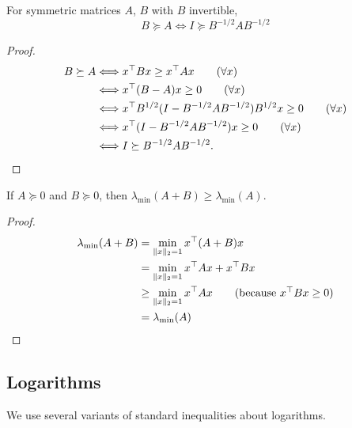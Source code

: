 \begin{lemma} \label{lem:conj_succ}
  For symmetric matrices $A$, $B$ with $B$ invertible,
  \[
    B \succeq A \Longleftrightarrow I \succeq B^{-1/2} A B^{-1/2}
  \]
\end{lemma}
\begin{proof}
  \begin{align*}
    B \succeq A &\Longleftrightarrow x^{\top} B x \ge x^{\top} A x \tag{$\forall x$} \\
    &\Longleftrightarrow x^{\top}(B-A) x \ge 0 \tag{$\forall x$} \\
    &\Longleftrightarrow x^{\top} B^{1/2} (I-B^{-1/2}AB^{-1/2}) B^{1/2} x \ge 0 \tag{$\forall x$} \\
    &\Longleftrightarrow x^{\top} (I-B^{-1/2}AB^{-1/2}) x \ge 0 \tag{$\forall x$} \\
    &\Longleftrightarrow I \succeq B^{-1/2}AB^{-1/2}.
  \end{align*}
\end{proof}

\begin{lemma}
  If $A \succeq 0$ and $B \succeq 0$, then
$\lambda_{\min}(A + B) \ge \lambda_{\min}(A)$.
  \label{lem:min_ev_sum}
\end{lemma}
\begin{proof}
  \begin{align*}
    \lambda_{\min}(A + B) &= \min_{\|x\|_2 = 1} x\tran (A+B) x \\
    &= \min_{\|x\|_2 = 1} x\tran A x + x\tran B x \\
    &\ge \min_{\|x\|_2 = 1} x\tran A x \tag{because $x\tran B x \ge 0$} \\
    &= \lambda_{\min}(A)
  \end{align*}
\end{proof}

\subsection{Logarithms}

We use several variants of standard inequalities about logarithms.

